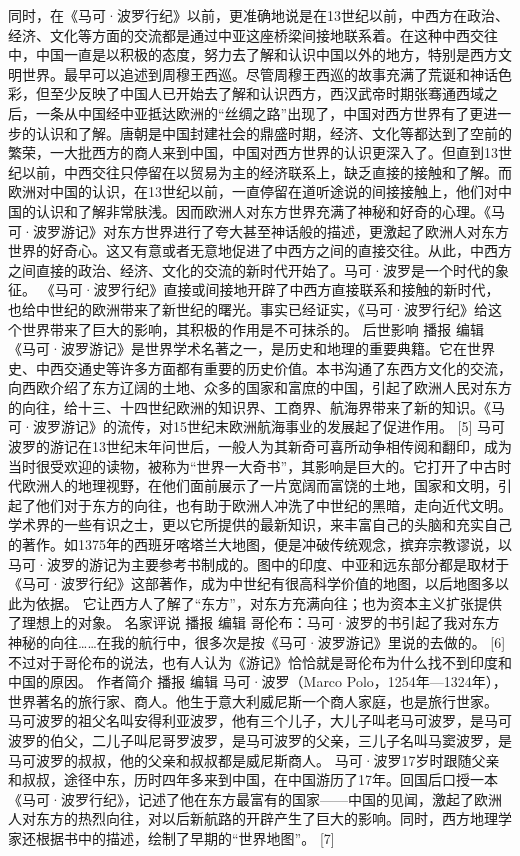 \documentclass[12pt,UTF8]{ctexbook}
\begin{document}
同时，在《马可·波罗行纪》以前，更准确地说是在13世纪以前，中西方在政治、经济、文化等方面的交流都是通过中亚这座桥梁间接地联系着。在这种中西交往中，中国一直是以积极的态度，努力去了解和认识中国以外的地方，特别是西方文明世界。最早可以追述到周穆王西巡。尽管周穆王西巡的故事充满了荒诞和神话色彩，但至少反映了中国人已开始去了解和认识西方，西汉武帝时期张骞通西域之后，一条从中国经中亚抵达欧洲的“丝绸之路”出现了，中国对西方世界有了更进一步的认识和了解。唐朝是中国封建社会的鼎盛时期，经济、文化等都达到了空前的繁荣，一大批西方的商人来到中国，中国对西方世界的认识更深入了。但直到13世纪以前，中西交往只停留在以贸易为主的经济联系上，缺乏直接的接触和了解。而欧洲对中国的认识，在13世纪以前，一直停留在道听途说的间接接触上，他们对中国的认识和了解非常肤浅。因而欧洲人对东方世界充满了神秘和好奇的心理。《马可·波罗游记》对东方世界进行了夸大甚至神话般的描述，更激起了欧洲人对东方世界的好奇心。这又有意或者无意地促进了中西方之间的直接交往。从此，中西方之间直接的政治、经济、文化的交流的新时代开始了。马可·波罗是一个时代的象征。
《马可·波罗行纪》直接或间接地开辟了中西方直接联系和接触的新时代，也给中世纪的欧洲带来了新世纪的曙光。事实已经证实，《马可·波罗行纪》给这个世界带来了巨大的影响，其积极的作用是不可抹杀的。
后世影响
播报
编辑
《马可·波罗游记》是世界学术名著之一，是历史和地理的重要典籍。它在世界史、中西交通史等许多方面都有重要的历史价值。本书沟通了东西方文化的交流，向西欧介绍了东方辽阔的土地、众多的国家和富庶的中国，引起了欧洲人民对东方的向往，给十三、十四世纪欧洲的知识界、工商界、航海界带来了新的知识。《马可·波罗游记》的流传，对15世纪末欧洲航海事业的发展起了促进作用。 [5]
马可波罗的游记在13世纪末年问世后，一般人为其新奇可喜所动争相传阅和翻印，成为当时很受欢迎的读物，被称为“世界一大奇书”，其影响是巨大的。它打开了中古时代欧洲人的地理视野，在他们面前展示了一片宽阔而富饶的土地，国家和文明，引起了他们对于东方的向往，也有助于欧洲人冲洗了中世纪的黑暗，走向近代文明。学术界的一些有识之士，更以它所提供的最新知识，来丰富自己的头脑和充实自己的著作。如1375年的西班牙喀塔兰大地图，便是冲破传统观念，摈弃宗教谬说，以马可·波罗的游记为主要参考书制成的。图中的印度、中亚和远东部分都是取材于《马可·波罗行纪》这部著作，成为中世纪有很高科学价值的地图，以后地图多以此为依据。
它让西方人了解了“东方”，对东方充满向往；也为资本主义扩张提供了理想上的对象。
名家评说
播报
编辑
哥伦布：马可·波罗的书引起了我对东方神秘的向往……在我的航行中，很多次是按《马可·波罗游记》里说的去做的。 [6]
不过对于哥伦布的说法，也有人认为《游记》恰恰就是哥伦布为什么找不到印度和中国的原因。
作者简介
播报
编辑
马可·波罗（Marco Polo，1254年—1324年），世界著名的旅行家、商人。他生于意大利威尼斯一个商人家庭，也是旅行世家。
马可波罗的祖父名叫安得利亚波罗，他有三个儿子，大儿子叫老马可波罗，是马可波罗的伯父，二儿子叫尼哥罗波罗，是马可波罗的父亲，三儿子名叫马窦波罗，是马可波罗的叔叔，他的父亲和叔叔都是威尼斯商人。
马可·波罗17岁时跟随父亲和叔叔，途径中东，历时四年多来到中国，在中国游历了17年。回国后口授一本《马可·波罗行纪》，记述了他在东方最富有的国家——中国的见闻，激起了欧洲人对东方的热烈向往，对以后新航路的开辟产生了巨大的影响。同时，西方地理学家还根据书中的描述，绘制了早期的“世界地图”。 [7]
\end{document}
